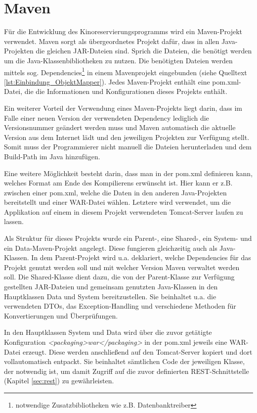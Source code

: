 \section{Maven}
\label{sec:maven}
\authorsection{\authorSG}

Für die Entwicklung des Kinoreservierungsprogramms wird ein Maven-Projekt verwendet.
Maven sorgt als übergeordnetes Projekt dafür, dass in allen Java-Projekten die gleichen JAR-Dateien sind.
Sprich die Dateien, die benötigt werden um die Java-Klassenbibliotheken zu nutzen.
Die benötigten Dateien werden mittels sog. Dependencies\footnote{notwendige Zusatzbibliotheken wie z.B. Datenbanktreiber} in einem Mavenprojekt eingebunden (siehe Quelltext \vref{lst:Einbindung_ObjektMapper}).
Jedes Maven-Projekt enthält eine pom.xml-Datei, die die Informationen und Konfigurationen dieses Projekts enthält.

Ein weiterer Vorteil der Verwendung eines Maven-Projekts liegt darin, dass im Falle einer neuen Version der verwendeten Dependency lediglich die Versionsnummer geändert werden muss und Maven automatisch die aktuelle Version aus dem Internet lädt und den jeweiligen Projekten zur Verfügung stellt.
Somit muss der Programmierer nicht manuell die Dateien herunterladen und dem Build-Path im Java hinzufügen.

Eine weitere Möglichkeit besteht darin, dass man in der pom.xml definieren kann, welches Format am Ende des Kompilierens erwünscht ist.
Hier kann er z.B. zwischen einer pom.xml, welche die Daten in den anderen Java-Projekten bereitstellt und einer WAR-Datei wählen.
Letztere wird verwendet, um die Applikation auf einem in diesem Projekt verwendeten Tomcat-Server laufen zu lassen.

Als Struktur für dieses Projekts wurde ein Parent-, eine Shared-, ein System- und ein Data-Maven-Projekt angelegt.
Diese fungieren gleichzeitig auch als Java-Klassen.
In dem Parent-Projekt wird u.a. deklariert, welche Dependencies für das Projekt genutzt werden soll und mit welcher Version Maven verwaltet werden soll.
Die Shared-Klasse dient dazu, die von der Parent-Klasse zur Verfügung gestellten JAR-Dateien und gemeinsam genutzten Java-Klassen in den Hauptklassen Data und System bereitzustellen.
Sie beinhaltet u.a. die verwendeten \acp{DTO}, das Exception-Handling und verschiedene Methoden für Konvertierungen und Überprüfungen. 

In den Hauptklassen System und Data wird über die zuvor getätigte Konfiguration \emph{<packaging>war</packaging>} in der pom.xml jeweils eine WAR-Datei erzeugt.
Diese werden anschließend auf den Tomcat-Server kopiert und dort vollautomatisch entpackt.
Sie beinhaltet sämtlichen Code der jeweiligen Klasse, der notwendig ist, um damit Zugriff auf die zuvor definierten \acs{REST}-Schnittstelle (Kapitel \vref{sec:rest}) zu gewährleisten.